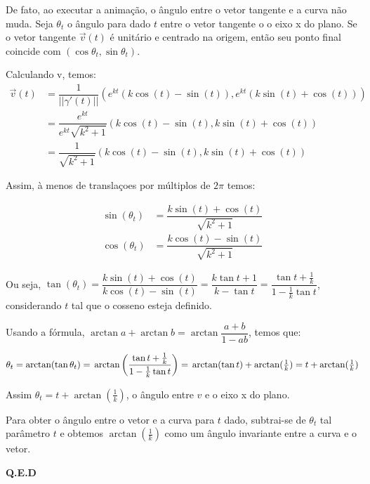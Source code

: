 \documentclass[12pt,letterpaper]{article}
\begin{document}
\begin{enumerate}
		De fato, ao executar a animação, o ângulo entre o vetor tangente e a curva não muda. Seja $\theta_t$ o ângulo para dado $t$ entre o vetor tangente o o eixo x do plano. Se o vetor tangente $\vec v(t)$ é unitário e centrado na origem, então seu ponto final coincide com $(\cos \theta _t,\sin\theta _t)$.
		
		Calculando v, temos:
		\begin{align*}
		\vec v (t)&=\dfrac{1}{||\gamma'(t)||}\left(e^{k t} (k \cos(t) - \sin(t)), e^{kt} (k \sin(t) + \cos(t))\right)\\
		&=\dfrac{e^{kt}}{e^{k t}\sqrt{k^2 + 1} }\left(k \cos(t) - \sin(t), k \sin(t) + \cos(t)\right)\\
		&=\dfrac{1}{\sqrt{k^2 + 1} }\left(k \cos(t) - \sin(t), k \sin(t) + \cos(t)\right)
		\end{align*}
		
		Assim, à menos de translaçoes por múltiplos de $2\pi$ temos:
		
		\begin{align*}
		\sin (\theta_t)&=\dfrac{k \sin(t) + \cos(t)}{\sqrt{k^2 + 1}}\\
		\cos(\theta_t)&=\dfrac{k \cos(t) - \sin(t)}{\sqrt{k^2 + 1} }
		\end{align*}
		
		Ou seja, $\tan(\theta_t)=\dfrac{k \sin(t) + \cos(t)}{k \cos(t) - \sin(t)}=\dfrac{k\tan t+1}{k-\tan t}=\dfrac{\tan t+\frac1 k}{1-\frac1 k\tan t}$, considerando $t$ tal que o cosseno esteja definido.
		
		Usando a fórmula, $\arctan a + \arctan b = \arctan \dfrac {a + b} {1 - a b}$, temos que:
		
		$\theta_t=\arctan(\tan \theta_t)=\\\arctan\left(\dfrac{\tan t+\frac1 k}{1-\frac1 k\tan t}\right)=\\\arctan(\tan t)+\arctan(\frac1 k)= \\t+\arctan(\frac1 k)$
		
		Assim $\theta_t=t+\arctan(\frac1 k)$, o ângulo entre $v$ e o eixo x do plano.
		
		Para obter o ângulo entre o vetor e a curva\cite{wiki:Tangential_angle} para $t$ dado, subtrai-se de $\theta_t$ tal parâmetro $t$ e obtemos $\arctan(\frac1 k)$ como um ângulo invariante entre a curva e o vetor.
		
		\begin{flushright}
			\textbf{Q.E.D}
		\end{flushright}
	\end{enumerate}
	
	
	\newpage
	
	
	
\end{document}
